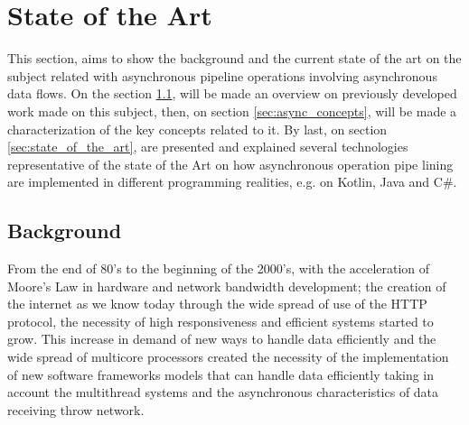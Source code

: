 % 
%  
%
\chapter{State of the Art}
\label{cha:users_manual}

This section, aims to show the background and the current state of the art on the subject related with asynchronous pipeline operations involving asynchronous data flows.  
On the section \ref{sec:related_work}, will be made an overview on previously developed work made on this subject, then, on section \ref{sec:async_concepts}, will be made a characterization of the key concepts related to it. By last, on section \ref{sec:state_of_the_art}, are presented and explained several technologies representative of the state of the Art on how asynchronous operation pipe lining are implemented in different programming realities, e.g. on Kotlin, Java and C\#. 


\section{Background} %
\label{sec:related_work}


From the end of 80’s to the beginning of the 2000’s, with the acceleration of Moore's Law in hardware and network bandwidth development; the creation of the internet as we know today through the wide spread of use of the HTTP protocol, the necessity of high responsiveness and efficient systems started to grow. This increase in demand of new ways to handle data efficiently and the wide spread of multicore processors created the necessity of the implementation of new software frameworks models that can handle data efficiently taking in account the multithread systems and the asynchronous characteristics of data receiving throw network. 

